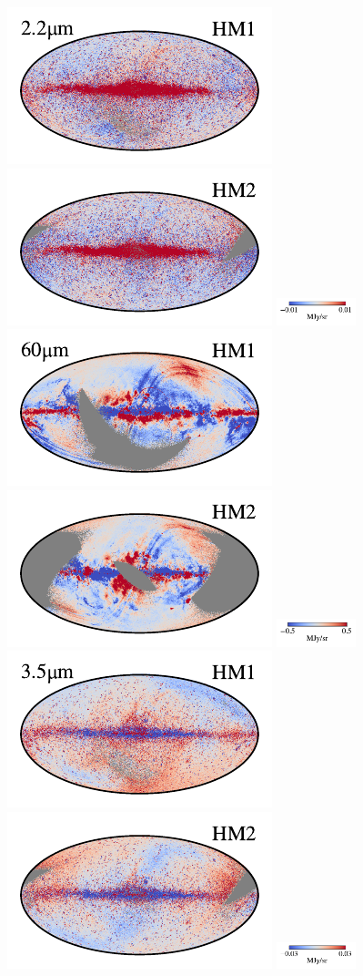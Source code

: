 \documentclass[twocolumn]{aa}
\begin{document}
\begin{figure}[t]
    \includegraphics[width=0.22\linewidth]{figs/compare_zodi_res/cosmoglobe_res_02a.pdf}%
    \includegraphics[width=0.22\linewidth]{figs/compare_zodi_res/cosmoglobe_res_02b.pdf}%
    \includegraphics[width=23mm,angle=90]{figs/compare_zodi_res/cbar_02.pdf}\hspace*{3mm}
    \includegraphics[width=0.22\linewidth]{figs/compare_zodi_res/cosmoglobe_res_07a.pdf}%
    \includegraphics[width=0.22\linewidth]{figs/compare_zodi_res/cosmoglobe_res_07b.pdf}%
    \includegraphics[width=23mm,angle=90]{figs/compare_zodi_res/cbar_07.pdf}\\
    \includegraphics[width=0.22\linewidth]{figs/compare_zodi_res/cosmoglobe_res_03a.pdf}%
    \includegraphics[width=0.22\linewidth]{figs/compare_zodi_res/cosmoglobe_res_03b.pdf}%
    \includegraphics[width=23mm,angle=90]{figs/compare_zodi_res/cbar_03.pdf}\hspace*{3mm}

\end{figure}
\end{document}
